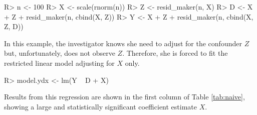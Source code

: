 \documentclass[
]{jss}
\begin{document}
\begin{CodeChunk}

\begin{CodeInput}
R> n <- 100
R> X <- scale(rnorm(n))
R> Z <- resid_maker(n, X) 
R> D <- X + Z + resid_maker(n, cbind(X, Z)) 
R> Y <- X + Z + resid_maker(n, cbind(X, Z, D))
\end{CodeInput}
\end{CodeChunk}

In this example, the investigator knows she need to adjust for the
confounder \(Z\) but, unfortunately, does not observe \(Z\). Therefore,
she is forced to fit the restricted linear model adjusting for \(X\)
only.

\begin{CodeChunk}

\begin{CodeInput}
R> model.ydx <- lm(Y ~ D + X) 
\end{CodeInput}
\end{CodeChunk}

Results from this regression are shown in the first column of Table
\ref{tab:naive}, showing a large and statistically significant
coefficient estimate \(X\).
\end{document}
